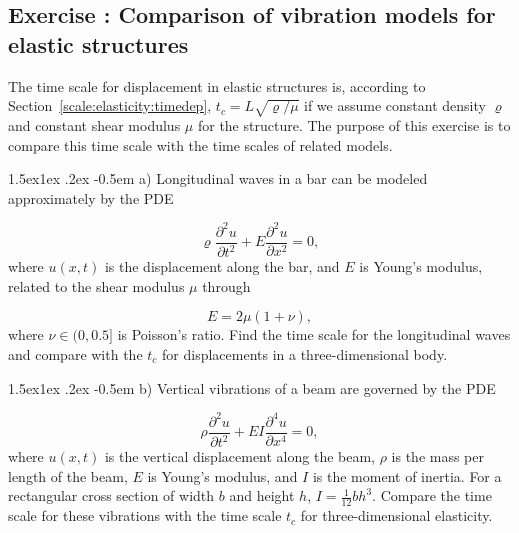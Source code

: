 \documentclass[graybox,envcountchap,sectrefs,final]{svmonodo}
\makeatletter
\newenvironment{doconceexercise}{}{}
\newcounter{doconceexercisecounter}
\newcommand\subex{\@startsection{paragraph}{4}{\z@}%
                  {1.5ex\@plus1ex \@minus.2ex}%
                  {-0.5em}%
                  {\normalfont\normalsize\bfseries}}
\makeatother
\begin{document}
\begin{doconceexercise}

\subsection*{Exercise \thedoconceexercisecounter: Comparison of vibration models for elastic structures}

\label{scale::exer:elasticity:vibmodels}

The time scale for displacement in elastic structures is, according to
Section~\ref{scale:elasticity:timedep}, $t_c=L\sqrt{\varrho/\mu}$ if we
assume constant density $\varrho$ and constant shear modulus $\mu$ for
the structure. The purpose of this exercise is to compare this time
scale with the time scales of related models.


\subex{a)}
Longitudinal waves in a bar can be modeled approximately by the PDE

\[ \varrho\frac{\partial^2 u}{\partial t^2} + E\frac{\partial^2 u}{\partial x^2} = 0,\]
where $u(x,t)$ is the displacement along the bar, and $E$ is Young's modulus,
related to the shear modulus $\mu$ through

\[ E = 2\mu (1+\nu),\]
where $\nu\in (0,0.5]$ is Poisson's ratio.
Find the time scale for the longitudinal waves and compare with the $t_c$
for displacements in a three-dimensional body.



\subex{b)}
Vertical vibrations of a beam are governed by the PDE

\[ \rho\frac{\partial^2 u}{\partial t^2} + EI\frac{\partial^4 u}{\partial x^4} = 0,\]
where $u(x,t)$ is the vertical displacement along the beam,
$\rho$ is the mass per length of the beam,
$E$ is Young's modulus, and $I$ is the moment of inertia. For a
rectangular cross section of width $b$ and height $h$, $I=\frac{1}{12}bh^3$.
Compare the time scale for these vibrations with the time scale $t_c$
for three-dimensional elasticity.



\end{doconceexercise}
\end{document}
